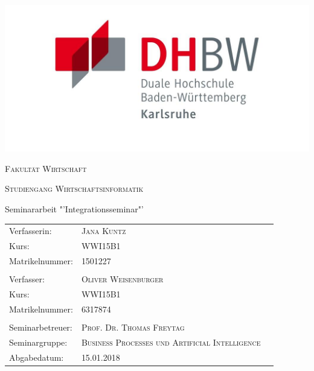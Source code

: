\begin{titlepage}
	\centering
	
	\includegraphics{pictures/dhbw_logo.png}
	\vspace{1cm}
	\par
	{\scshape\LARGE Fakultät Wirtschaft\par}
	\vspace{0.5cm}
	{\scshape\Large Studiengang Wirtschaftsinformatik\par}
	\vspace{1cm}
	{\large\bfseries \ThesisTitle \par}
	\vspace{1cm}
	{\Large Seminararbeit "'Integrationsseminar"'\par}

	\vfill
	
	\begin{center}
	\begin{tabularx}{\columnwidth}{XXl}
	Verfasserin: &  \textsc{Jana Kuntz}\\
	Kurs: & \textsc{WWI15B1} \\
	Matrikelnummer: & \textsc{1501227} \\\\
	Verfasser: & \textsc{Oliver Weisenburger} \\
	Kurs: & \textsc{WWI15B1} \\
	Matrikelnummer: & \textsc{6317874} \\\\
	Seminarbetreuer: &  \textsc{Prof. Dr. Thomas Freytag} 	\\
	Seminargruppe:&  \textsc{Business Processes und Artificial Intelligence} 	 \\
	Abgabedatum: & \textsc{15.01.2018} \\
\end{tabularx} 
 \end{center}

\end{titlepage}
